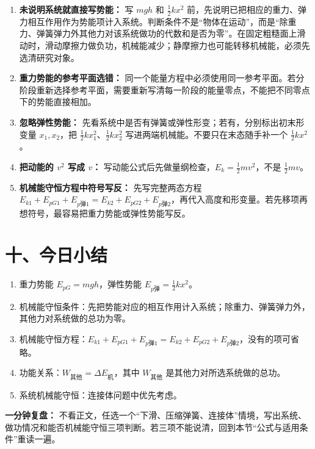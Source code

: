 \begin{mistakebox}
\begin{enumerate}
  \item \textbf{未说明系统就直接写势能：} 写 $mgh$ 和 $\frac12kx^2$ 前，先说明已把相应的重力、弹力相互作用作为势能项计入系统。判断条件不是“物体在运动”，而是“除重力、弹簧弹力外其他力对该系统做功的代数和是否为零”。在固定粗糙面上滑动时，滑动摩擦力做负功，机械能减少；静摩擦力也可能转移机械能，必须先选清研究对象。

  \item \textbf{重力势能的参考平面选错：} 同一个能量方程中必须使用同一参考平面。若分阶段重新选择参考平面，需要重新写清每一阶段的能量零点，不能把不同零点下的势能直接相加。

  \item \textbf{忽略弹性势能：} 先看系统中是否有弹簧或弹性形变；若有，分别标出初末形变量 $x_1,x_2$，把 $\frac12kx_1^2$、$\frac12kx_2^2$ 写进两端机械能。不要只在末态随手补一个 $\frac12kx^2$。

  \item \textbf{把动能的 $v^2$ 写成 $v$：} 写动能公式后先做量纲检查，$E_k = \frac12 mv^2$，不是 $\frac12 mv$。

  \item \textbf{机械能守恒方程中符号写反：} 先写完整两态方程 $E_{k1}+E_{pG1}+E_{p\text{弹}1}=E_{k2}+E_{pG2}+E_{p\text{弹}2}$，再代入高度和形变量。若先移项再想符号，最容易把重力势能或弹性势能写反。
\end{enumerate}
\end{mistakebox}

\section*{十、今日小结}
\enlargethispage{2\baselineskip}

\begin{enumerate}
  \item 重力势能 $E_{pG} = mgh$，弹性势能 $E_{p\text{弹}} = \frac12 kx^2$。
  \item 机械能守恒条件：先把势能对应的相互作用计入系统；除重力、弹簧弹力外，其他力对系统做的总功为零。
  \item 机械能守恒方程：$E_{k1}+E_{pG1}+E_{p\text{弹}1}=E_{k2}+E_{pG2}+E_{p\text{弹}2}$，没有的项可省略。
  \item 功能关系：$W_{\text{其他}} = \Delta E_{\text{机}}$，其中 $W_{\text{其他}}$ 是其他力对所选系统做的总功。
  \item 系统机械能守恒：连接体问题中优先考虑。
\end{enumerate}

\textbf{一分钟复盘：} 不看正文，任选一个“下滑、压缩弹簧、连接体”情境，写出系统、做功情况和能否机械能守恒三项判断。若三项不能说清，回到本节“公式与适用条件”重读一遍。
